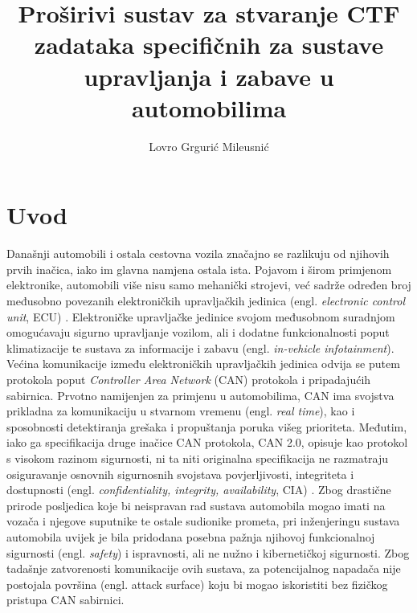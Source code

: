 \documentclass[times, utf8, diplomski, numeric]{fer}
\begin{document}

\title{Proširivi sustav za stvaranje CTF zadataka specifičnih za sustave upravljanja i
zabave u automobilima}

\author{Lovro Grgurić Mileusnić}

\maketitle

\izvornik

\zahvala{}

\tableofcontents

\chapter{Uvod}
Današnji automobili i ostala cestovna vozila značajno se razlikuju od njihovih prvih inačica, iako im glavna namjena ostala ista. Pojavom i širom primjenom elektronike, automobili više nisu samo mehanički strojevi, već sadrže određen broj međusobno povezanih elektroničkih upravljačkih jedinica (engl. \textit{electronic control unit}, ECU) \cite{koscher2010}. Elektroničke upravljačke jedinice svojom međusobnom suradnjom omogućavaju sigurno upravljanje vozilom, ali i dodatne funkcionalnosti poput klimatizacije te sustava za informacije i zabavu (engl. \textit{in-vehicle infotainment}). Većina komunikacije između elektroničkih upravljačkih jedinica odvija se putem protokola poput \textit{Controller Area Network} (CAN) protokola i pripadajućih sabirnica. Prvotno namijenjen za primjenu u automobilima, CAN ima svojstva prikladna za komunikaciju u stvarnom vremenu (engl. \textit{real time}), kao i sposobnosti detektiranja grešaka i propuštanja poruka višeg prioriteta\cite{canopen1}. Međutim, iako ga specifikacija druge inačice CAN protokola, CAN 2.0, opisuje kao protokol s visokom razinom sigurnosti, ni ta niti originalna specifikacija ne razmatraju osiguravanje osnovnih sigurnosnih svojstava povjerljivosti, integriteta i dostupnosti (engl. \textit{confidentiality, integrity, availability}, CIA) \cite{bosch1991, canislabs1}. Zbog drastične prirode posljedica koje bi neispravan rad sustava automobila mogao imati na vozača i njegove suputnike te ostale sudionike prometa, pri inženjeringu sustava automobila uvijek je bila pridodana posebna pažnja njihovoj funkcionalnoj sigurnosti (engl. \textit{safety}) i ispravnosti, ali ne nužno i kibernetičkoj sigurnosti\cite{koscher2010}. Zbog tadašnje zatvorenosti komunikacije ovih sustava, za potencijalnog napadača nije postojala površina (engl. attack surface) koju bi mogao iskoristiti bez fizičkog pristupa CAN sabirnici.
\end{document}
